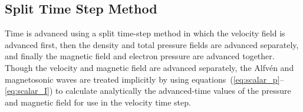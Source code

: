 \documentclass[draft]{book}
\begin{document}
\subsection{Split Time Step Method}



Time is advanced using a split time-step method in which the velocity
field is advanced first, then the density and total pressure fields
are advanced separately, and finally the magnetic field and electron
pressure are advanced together.  Though the velocity and magnetic
field are advanced separately, the Alfv\'en and magnetosonic waves are
treated implicitly by using
equations~(\ref{eq:scalar_p}--\ref{eq:scalar_I}) to calculate
analytically the advanced-time values of the pressure and magnetic
field for use in the velocity time step.
\end{document}
